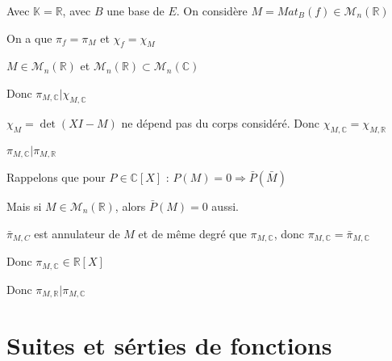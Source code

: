 \documentclass[a4paper,12pt]{book}
\def\R{\mathbb{R}}
\def\C{\mathbb{C}}
\def\K{\mathbb{K}}
\begin{document}
{\par Avec $\K=\R$, avec $B$ une base de $E$. On considère $M=Mat_B(f)\in\mathcal{M}_n(\R)$ \par On a que $\pi_f=\pi_M$ et $\chi_f=\chi_M$ \par $M\in\mathcal{M}_n(\R)$ et $\mathcal{M}_n(\R)\subset \mathcal{M}_n(\C)$ \par Donc $\pi_{M,\C}\vert \chi_{M,\C}$ \par $\chi_M = \det(XI-M)$ ne dépend pas du corps considéré. Donc $\chi_{M,\C}=\chi_{M,\R}$ \par $\pi_{M,\C}\vert\pi_{M,\R}$ \par Rappelons que pour $P\in \C[X]$ : $P(M)=0\Rightarrow \bar{P}(\bar{M})$ \par Mais si $M\in\mathcal{M}_n(\R)$, alors $\bar{P}(M)=0$ aussi. \par $\bar{\pi}_{M,C}$ est annulateur de $M$ et de même degré que $\pi_{M,\C}$, donc $\pi_{M,\C}=\bar{\pi}_{M,\C}$ \par Donc $\pi_{M,\C}\in\R[X]$ \par Donc $\pi_{M,\R}\vert\pi_{M,\C}$
}



\chapter{Suites et sérties de fonctions}
\end{document}
